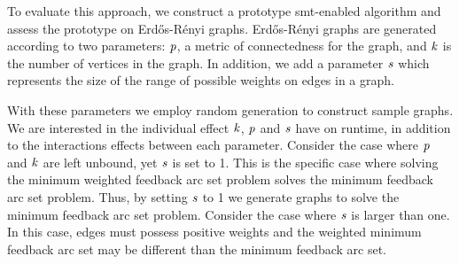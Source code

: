 \label{section:case-studies}

To evaluate this approach, we construct a prototype \ac{smt}-enabled algorithm
and assess the prototype on Erd\H{o}s-R\'{e}nyi graphs. Erd\H{o}s-R\'{e}nyi
graphs are generated according to two parameters: $\mathit{p}$, a metric of
connectedness for the graph, and $\mathit{k}$ is the number of vertices in the
graph. In addition, we add a parameter $\mathit{s}$ which represents the size of the
range of possible weights on edges in a graph.

With these parameters we employ random generation to construct sample graphs. We
are interested in the individual effect $\mathit{k}$, $\mathit{p}$ and $\mathit{s}$ have on
runtime, in addition to the interactions effects between each parameter.
Consider the case where $\mathit{p}$ and $\mathit{k}$ are left unbound, yet $\mathit{s}$ is
set to 1. This is the specific case where solving the minimum weighted feedback
arc set problem solves the minimum feedback arc set problem. Thus, by setting
$\mathit{s}$ to 1 we generate graphs to solve the minimum feedback arc set problem.
Consider the case where $\mathit{s}$ is larger than one. In this case, edges must
possess positive weights and the weighted minimum feedback arc set may be
different than the minimum feedback arc set.





